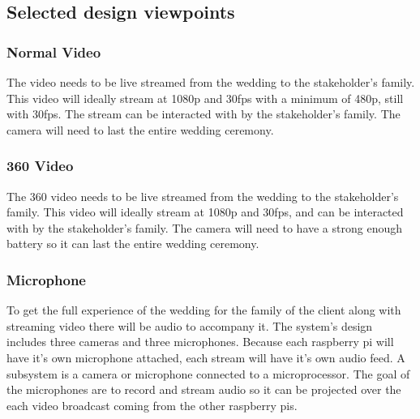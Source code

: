 \documentclass[onecolumn, draftclsnofoot,10pt, compsoc]{IEEEtran}
\begin{document}
    \subsection{Selected design viewpoints}
        \subsubsection{Normal Video}
        The video needs to be live streamed from the wedding to the stakeholder's family.
        This video will ideally stream at 1080p and 30fps with a minimum of 480p, still with 30fps.
        The stream can be interacted with by the stakeholder's family.
        The camera will need to last the entire wedding ceremony.
        
        \subsubsection{360 Video}
        The 360 video needs to be live streamed from the wedding to the stakeholder's family.
        This video will ideally stream at 1080p and 30fps, and can be interacted with by the stakeholder's family.
        The camera will need to have a strong enough battery so it can last the entire wedding ceremony.
        
        
        \subsubsection{Microphone}
        To get the full experience of the wedding for the family of the client along with streaming video there will be audio to accompany it. The system’s design includes three cameras and three microphones. Because each raspberry pi will have it's own microphone attached, each stream will have it's own audio feed.  
        A subsystem is a camera or microphone connected to a microprocessor. 
        The goal of the microphones are to record and stream audio so it can be projected over the each video broadcast coming from the other raspberry pis. 
        
\end{document}
